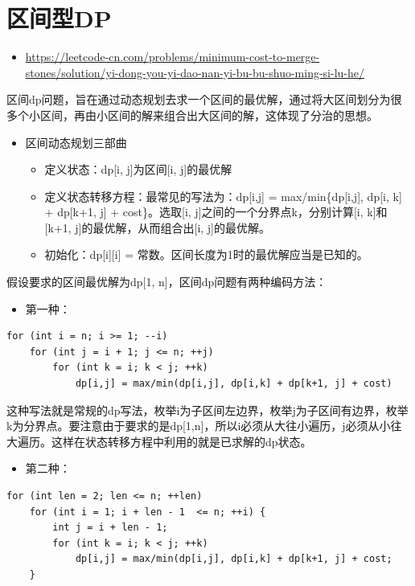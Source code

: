\documentclass[9pt, b5paaper]{book}
\begin{document}
\section{区间型DP}
\label{sec-1-3}
\begin{itemize}
\item \url{https://leetcode-cn.com/problems/minimum-cost-to-merge-stones/solution/yi-dong-you-yi-dao-nan-yi-bu-bu-shuo-ming-si-lu-he/}
\end{itemize}

区间dp问题，旨在通过动态规划去求一个区间的最优解，通过将大区间划分为很多个小区间，再由小区间的解来组合出大区间的解，这体现了分治的思想。

\begin{itemize}
\item 区间动态规划三部曲
\begin{itemize}
\item 定义状态：dp[i, j]为区间[i, j]的最优解
\item 定义状态转移方程：最常见的写法为：dp[i,j] = max/min\{dp[i,j], dp[i, k] + dp[k+1, j] + cost\}。选取[i, j]之间的一个分界点k，分别计算[i, k]和[k+1, j]的最优解，从而组合出[i, j]的最优解。
\item 初始化：dp[i][i] = 常数。区间长度为1时的最优解应当是已知的。
\end{itemize}
\end{itemize}

假设要求的区间最优解为dp[1, n]，区间dp问题有两种编码方法：

\begin{itemize}
\item 第一种：
\end{itemize}
\begin{verbatim}
for (int i = n; i >= 1; --i) 
    for (int j = i + 1; j <= n; ++j) 
        for (int k = i; k < j; ++k) 
            dp[i,j] = max/min(dp[i,j], dp[i,k] + dp[k+1, j] + cost)
\end{verbatim}

这种写法就是常规的dp写法，枚举i为子区间左边界，枚举j为子区间有边界，枚举k为分界点。要注意由于要求的是dp[1,n]，所以i必须从大往小遍历，j必须从小往大遍历。这样在状态转移方程中利用的就是已求解的dp状态。
\begin{itemize}
\item 第二种：
\end{itemize}
\begin{verbatim}
for (int len = 2; len <= n; ++len) 
    for (int i = 1; i + len - 1  <= n; ++i) {
        int j = i + len - 1;
        for (int k = i; k < j; ++k) 
            dp[i,j] = max/min(dp[i,j], dp[i,k] + dp[k+1, j] + cost;
    }
\end{verbatim}
\end{document}
